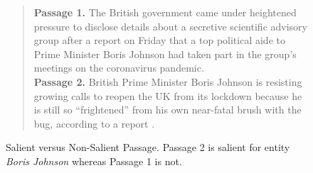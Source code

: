 \begin{figure}[t]
    \centering
   \begin{quote}
\textbf{Passage 1.} The British government came under heightened pressure to disclose details about a secretive scientific advisory group after a report on Friday that a top political aide to Prime Minister Boris Johnson had taken part in the group’s meetings on the coronavirus pandemic. \\
\textbf{Passage 2.} British Prime Minister Boris Johnson is resisting growing calls to reopen the UK from its lockdown because he is still so “frightened” from his own near-fatal brush with the bug, according to a report .
\end{quote}
    \caption{Salient versus Non-Salient Passage. Passage 2 is salient for entity \textit{Boris Johnson} whereas Passage 1 is not.}
    \label{fig:Salience}
\end{figure}